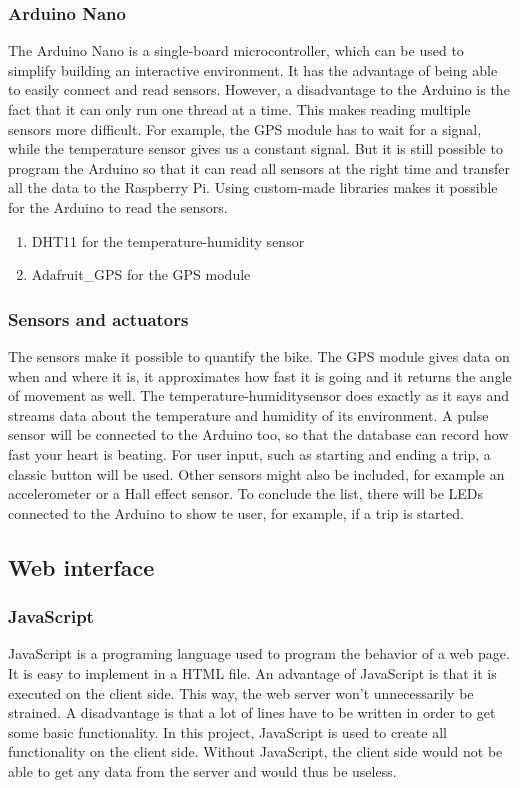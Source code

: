 \subsubsection{Arduino Nano}
The Arduino Nano is a single-board microcontroller, which can be used to simplify building an interactive environment. It has the advantage of being able to easily connect and read sensors. However, a disadvantage to the Arduino is the fact that it can only run one thread at a time. This makes reading multiple sensors more difficult. For example, the GPS module has to wait for a signal, while the temperature sensor gives us a constant signal. But it is still possible to program the Arduino so that it can read all sensors at the right time and transfer all the data to the Raspberry Pi.
Using custom-made libraries makes it possible for the Arduino to read the sensors.
\begin{enumerate}
 \item DHT11 for the temperature-humidity sensor
 \item Adafruit\_GPS for the GPS module
\end{enumerate}

\subsubsection{Sensors and actuators}
The sensors make it possible to quantify the bike. The GPS module gives data on when and where it is, it approximates how fast it is going and it returns the angle of movement as well. The temperature-humiditysensor does exactly as it says and streams data about the temperature and humidity of its environment. A pulse sensor will be connected to the Arduino too, so that the database can record how fast your heart is beating. For user input, such as starting and ending a trip, a classic button will be used. Other sensors might also be included, for example an accelerometer or a Hall effect sensor. To conclude the list, there will be LEDs connected to the Arduino to show te user, for example, if a trip is started.

\subsection{Web interface}
\subsubsection{JavaScript}
JavaScript is a programing language used to program the behavior of a web page.
It is easy to implement in a HTML file. An advantage of JavaScript is that it is
executed on the client side. This way, the web server won't unnecessarily be strained.
A disadvantage is that a lot of lines have to be written in order to get some basic
functionality. In this project, JavaScript is used to create all functionality on the
client side. Without JavaScript, the client side would not be able to get any data from
the server and would thus be useless. 

